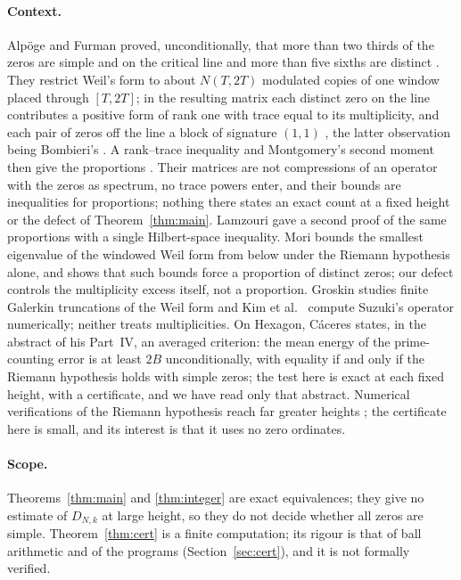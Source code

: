 \documentclass[11pt,a4paper]{article}
\theoremstyle{plain}
\theoremstyle{remark}
\begin{document}
\paragraph{Context.}
Alp\"oge and Furman \cite{alpoge-furman} proved, unconditionally, that more than two thirds of the zeros are simple
and on the critical line and more than five sixths are distinct \cite[Theorem~A, p.~1]{alpoge-furman}. They
restrict Weil's form to about $N(T,2T)$ modulated copies of one window placed through $[T,2T]$; in the resulting
matrix each distinct zero on the line contributes a positive form of rank one with trace equal to its multiplicity,
and each pair of zeros off the line a block of signature $(1,1)$ \cite[Proposition~4.1, p.~6]{alpoge-furman}, the
latter observation being Bombieri's \cite[§1.3, p.~3]{alpoge-furman}. A rank--trace inequality \cite[Lemma~3.2,
p.~5]{alpoge-furman} and Montgomery's second moment then give the proportions \cite[§1.2, (1.2),
p.~2]{alpoge-furman}. Their matrices are not compressions of an operator with the zeros as spectrum, no trace powers
enter, and their bounds are inequalities for proportions; nothing there states an exact count at a fixed height or
the defect of Theorem~\ref{thm:main}. Lamzouri \cite{lamzouri} gave a second proof of the same proportions with a
single Hilbert-space inequality. Mori \cite{mori} bounds the smallest
eigenvalue of the windowed Weil form from below under the Riemann hypothesis alone, and shows that such bounds force a
proportion of distinct zeros; our defect controls the multiplicity excess itself, not a proportion. Groskin
\cite{groskin} studies finite Galerkin truncations of the Weil form and Kim et al.\ \cite{kim} compute Suzuki's
operator numerically; neither treats multiplicities. On Hexagon, C\'aceres \cite{caceres} states, in the abstract
of his Part~IV, an averaged criterion: the mean energy of the prime-counting error is at least $2B$
unconditionally, with equality if and only if the Riemann hypothesis holds with simple zeros; the test here is
exact at each fixed height, with a certificate, and we have read only that abstract. Numerical verifications of the Riemann hypothesis reach far
greater heights \cite{platt-trudgian}; the certificate here is small, and its interest is that it uses no zero
ordinates.

\paragraph{Scope.}
Theorems~\ref{thm:main} and \ref{thm:integer} are exact equivalences; they give no estimate of $D_{N,k}$ at large
height, so they do not decide whether all zeros are simple. Theorem~\ref{thm:cert} is a finite computation; its
rigour is that of ball arithmetic and of the programs (Section~\ref{sec:cert}), and it is not formally verified.
\end{document}
